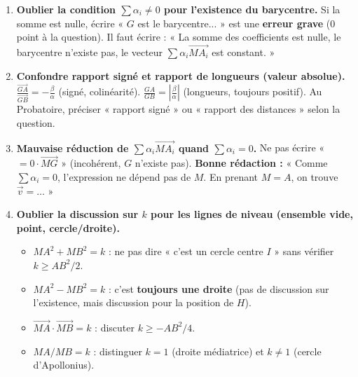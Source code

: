 \documentclass[11pt]{article}
\begin{document}
\begin{attention}
\begin{enumerate}
    \item \textbf{Oublier la condition $\sum \alpha_i \neq 0$ pour l'existence du barycentre.}
    Si la somme est nulle, écrire « $G$ est le barycentre... » est une \textbf{erreur grave} (0 point à la question). Il faut écrire : « La somme des coefficients est nulle, le barycentre n'existe pas, le vecteur $\sum \alpha_i \overrightarrow{MA_i}$ est constant. »
    
    \item \textbf{Confondre rapport signé et rapport de longueurs (valeur absolue).}
    $\frac{\overrightarrow{GA}}{\overrightarrow{GB}} = -\frac{\beta}{\alpha}$ (signé, colinéarité).
    $\frac{GA}{GB} = \left| \frac{\beta}{\alpha} \right|$ (longueurs, toujours positif).
    Au Probatoire, préciser « rapport signé » ou « rapport des distances » selon la question.
    
    \item \textbf{Mauvaise réduction de $\sum \alpha_i \overrightarrow{MA_i}$ quand $\sum \alpha_i = 0$.}
    Ne pas écrire « $= 0 \cdot \overrightarrow{MG}$ » (incohérent, $G$ n'existe pas).
    \textbf{Bonne rédaction :} « Comme $\sum \alpha_i = 0$, l'expression ne dépend pas de $M$. En prenant $M=A$, on trouve $\vec{v} = \dots$ »
    
    \item \textbf{Oublier la discussion sur $k$ pour les lignes de niveau (ensemble vide, point, cercle/droite).}
    \begin{itemize}
        \item $MA^2+MB^2=k$ : ne pas dire « c'est un cercle centre $I$ » sans vérifier $k \ge AB^2/2$.
        \item $MA^2-MB^2=k$ : c'est \textbf{toujours une droite} (pas de discussion sur l'existence, mais discussion pour la position de $H$).
        \item $\overrightarrow{MA}\cdot\overrightarrow{MB}=k$ : discuter $k \ge -AB^2/4$.
        \item $MA/MB=k$ : distinguer $k=1$ (droite médiatrice) et $k\neq 1$ (cercle d'Apollonius).
    \end{itemize}
    

\end{enumerate}
\end{attention}
\end{document}
